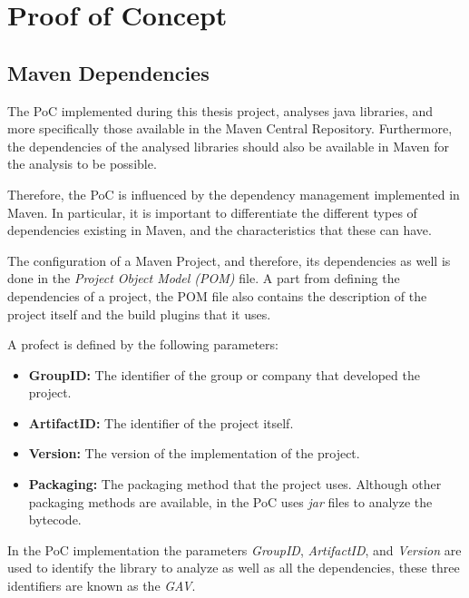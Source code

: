 \chapter{Proof of Concept}\label{ch:PoC}

\section{Maven Dependencies}
The PoC implemented during this thesis project, analyses java libraries, and more specifically those available in the Maven Central Repository. Furthermore, the dependencies of the analysed libraries should also be available in Maven for the analysis to be possible.

Therefore, the PoC is influenced by the dependency management implemented in Maven. In particular, it is important to differentiate the different types of dependencies existing in Maven, and the characteristics that these can have.

The configuration of a Maven Project, and therefore, its dependencies as well is done in the \textit{Project Object Model (POM)} file. A part from defining the dependencies of a project, the POM file also contains the description of the project itself and the build plugins that it uses.

A profect is defined by the following parameters:

\begin{itemize}
  \item \textbf{GroupID:} The identifier of the group or company that developed the project.
  \item \textbf{ArtifactID:} The identifier of the project itself.
  \item \textbf{Version:} The version of the implementation of the project.
  \item \textbf{Packaging:} The packaging method that the project uses. Although other packaging methods are available, in the PoC uses \textit{jar} files to analyze the bytecode.
\end{itemize}

In the PoC implementation the parameters \textit{GroupID}, \textit{ArtifactID}, and \textit{Version} are used to identify the library to analyze as well as all the dependencies, these three identifiers are known as the \textit{GAV}.

